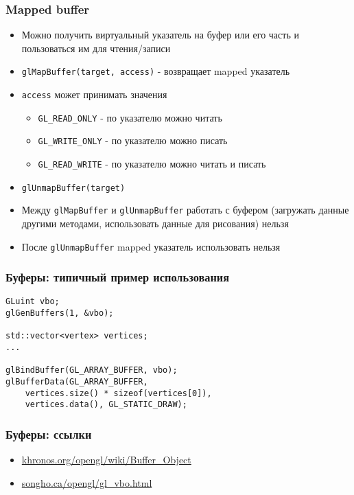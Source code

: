 \documentclass{beamer}
\begin{document}
\begin{frame}[fragile]
\frametitle{Mapped buffer}
\begin{itemize}
\item Можно получить виртуальный указатель на буфер или его часть и пользоваться им для чтения/записи
\pause
\item \verb|glMapBuffer(target, access)| - возвращает mapped указатель
\item \verb|access| может принимать значения
\begin{itemize}
\item \verb|GL_READ_ONLY| - по указателю можно читать
\item \verb|GL_WRITE_ONLY| - по указателю можно писать
\item \verb|GL_READ_WRITE| - по указателю можно читать и писать
\end{itemize}
\pause
\item \verb|glUnmapBuffer(target)|
\pause
\item Между \verb|glMapBuffer| и \verb|glUnmapBuffer| работать с буфером (загружать данные другими методами, использовать данные для рисования) нельзя
\pause
\item После \verb|glUnmapBuffer| mapped указатель использовать нельзя
\end{itemize}
\end{frame}

\begin{frame}[fragile]
\frametitle{Буферы: типичный пример использования}
\begin{verbatim}
GLuint vbo;
glGenBuffers(1, &vbo);

std::vector<vertex> vertices;
...

glBindBuffer(GL_ARRAY_BUFFER, vbo);
glBufferData(GL_ARRAY_BUFFER,
    vertices.size() * sizeof(vertices[0]),
    vertices.data(), GL_STATIC_DRAW);
\end{verbatim}
\end{frame}

\begin{frame}[fragile]
\frametitle{Буферы: ссылки}
\begin{itemize}
\item \href{https://www.khronos.org/opengl/wiki/Buffer_Object}{khronos.org/opengl/wiki/Buffer\_Object}
\item \href{https://www.songho.ca/opengl/gl_vbo.html}{songho.ca/opengl/gl\_vbo.html}
\end{itemize}
\end{frame}
\end{document}

